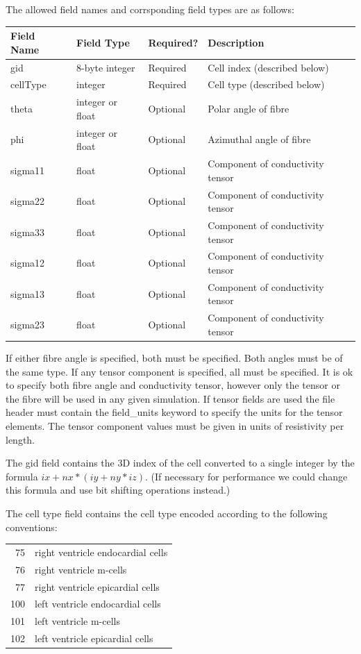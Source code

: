 \documentclass{article}
\begin{document}
The allowed field names and corrsponding field types are as follows:
\begin{tabular}{l|l|l|p{}}
  Field Name & Field Type & Required? & Description\\
  \hline
  gid &      8-byte integer   & Required & Cell index (described below)\\
  cellType & integer          & Required & Cell type (described below)\\
  theta &    integer or float & Optional & Polar angle of fibre\\
  phi &      integer or float & Optional & Azimuthal angle of fibre\\
  sigma11 &  float            & Optional & Component of conductivity tensor\\
  sigma22 &  float            & Optional & Component of conductivity tensor\\
  sigma33 &  float            & Optional & Component of conductivity tensor\\
  sigma12 &  float            & Optional & Component of conductivity tensor\\
  sigma13 &  float            & Optional & Component of conductivity tensor\\
  sigma23 &  float            & Optional & Component of conductivity tensor\\
\end{tabular}
If either fibre angle is specified, both must be specified.  Both angles
must be of the same type.  If any tensor component is specified, all
must be specified.  It is ok to specify both fibre angle and
conductivity tensor, however only the tensor or the fibre will be used
in any given simulation.  If tensor fields are used the file header must
contain the field_units keyword to specify the units for the tensor
elements.  The tensor component values must be given in units of
resistivity per length.

The gid field contains the 3D index of the cell converted to a single
integer by the formula $ix + nx*(iy + ny*iz)$.  (If necessary for
performance we could change this formula and use bit shifting operations
instead.)

The cell type field contains the cell type encoded according to the
following conventions:
\begin{center}
  \begin{tabular}{rl}
    75 & right ventricle endocardial cells\\
    76 & right ventricle m-cells\\
    77 & right ventricle epicardial cells\\
    100 & left ventricle endocardial cells\\
    101 & left ventricle m-cells\\
    102 & left ventricle epicardial cells\\
  \end{tabular}
\end{center}
\end{document}
